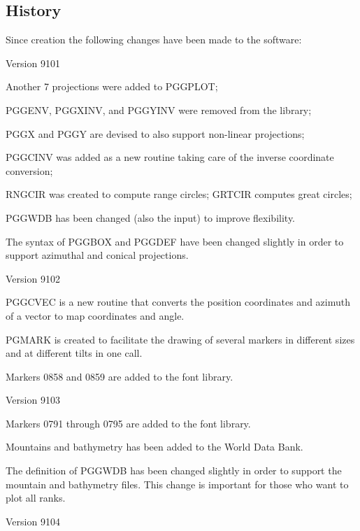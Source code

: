 \documentclass[titlepage,a4paper]{article}
\begin{document}
\subsection{History}
Since creation the following changes have been made to the software:
\begin{leftitemize}
\item Version 9101
\begin{leftitemize}
\item Another 7 projections were added to PGGPLOT;
\item PGGENV, PGGXINV, and PGGYINV were removed from the library;
\item PGGX and PGGY are devised to also support non-linear projections;
\item PGGCINV was added as a new routine taking care of the inverse coordinate
  conversion;
\item RNGCIR was created to compute range circles;
  GRTCIR computes great circles;
\item PGGWDB has been changed (also the input) to improve flexibility.
\item The syntax of PGGBOX and PGGDEF have been changed slightly in order to
  support azimuthal and conical projections.
\end{leftitemize}
\item Version 9102
\begin{leftitemize}
\item PGGCVEC is a new routine that converts the position coordinates and
  azimuth of a vector to map coordinates and angle.
\item PGMARK is created to facilitate the drawing of several markers in
  different sizes and at different tilts in one call.
\item Markers 0858 and 0859 are added to the font library.
\end{leftitemize}
\item Version 9103
\begin{leftitemize}
\item Markers 0791 through 0795 are added to the font library.
\item Mountains and bathymetry has been added to the World Data Bank.
\item The definition of PGGWDB has been changed slightly in order to support
  the mountain and bathymetry files. This change is important for those
  who want to plot all ranks.
\end{leftitemize}
\item Version 9104

\end{leftitemize}
\end{document}
